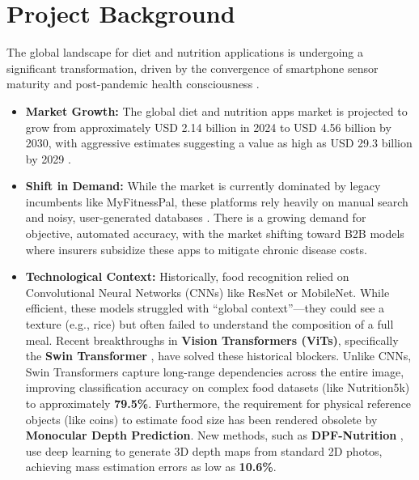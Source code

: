 \documentclass[fleqn,10pt]{SelfArx} %
\begin{document}

\section{Project Background}

The global landscape for diet and nutrition applications is undergoing a significant transformation, driven by the convergence of smartphone sensor maturity and post-pandemic health consciousness \cite{grandview2024market, mordor2024market}.

\begin{itemize}[noitemsep]
    \item \textbf{Market Growth:} The global diet and nutrition apps market is projected to grow from approximately USD 2.14 billion in 2024 to USD 4.56 billion by 2030, with aggressive estimates suggesting a value as high as USD 29.3 billion by 2029 \cite{grandview2024industry, businessresearch2025}.

    \item \textbf{Shift in Demand:} While the market is currently dominated by legacy incumbents like MyFitnessPal, these platforms rely heavily on manual search and noisy, user-generated databases \cite{garagegym2026}. There is a growing demand for objective, automated accuracy, with the market shifting toward B2B models where insurers subsidize these apps to mitigate chronic disease costs.

    \item \textbf{Technological Context:} Historically, food recognition relied on Convolutional Neural Networks (CNNs) like ResNet or MobileNet. While efficient, these models struggled with ``global context''---they could see a texture (e.g., rice) but often failed to understand the composition of a full meal. Recent breakthroughs in \textbf{Vision Transformers (ViTs)}, specifically the \textbf{Swin Transformer} \cite{wang2024swin}, have solved these historical blockers. Unlike CNNs, Swin Transformers capture long-range dependencies across the entire image, improving classification accuracy on complex food datasets (like Nutrition5k) to approximately \textbf{79.5\%}. Furthermore, the requirement for physical reference objects (like coins) to estimate food size has been rendered obsolete by \textbf{Monocular Depth Prediction}. New methods, such as \textbf{DPF-Nutrition} \cite{han2023dpf}, use deep learning to generate 3D depth maps from standard 2D photos, achieving mass estimation errors as low as \textbf{10.6\%}.
\end{itemize}
\end{document}
